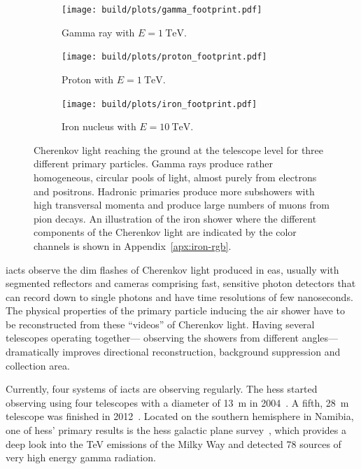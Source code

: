 \begin{figure}
  \centering
  \begin{subfigure}{0.3333\textwidth}%
    \texttt{[image: build/plots/gamma\_footprint.pdf]}%
    \caption{Gamma ray with $E = \SI{1}{\TeV}$.}%
  \end{subfigure}%
  \hfill%
  \begin{subfigure}{0.3333\textwidth}%
    \texttt{[image: build/plots/proton\_footprint.pdf]}%
    \caption{Proton with $E = \SI{1}{\TeV}$.}%
  \end{subfigure}%
  \hfill%
  \begin{subfigure}{0.3333\textwidth}%
    \texttt{[image: build/plots/iron\_footprint.pdf]}%
    \caption{Iron nucleus with $E = \SI{10}{\TeV}$.}%
  \end{subfigure}%
  \caption{%
    Cherenkov light reaching the ground at the telescope level for
    three different primary particles. 
    Gamma rays produce rather homogeneous, circular pools of light, almost
    purely from electrons and positrons. 
    Hadronic primaries produce more subshowers with high transversal momenta and
    produce large numbers of muons from pion decays.
    An illustration of the iron shower where the different components of the
    Cherenkov light are indicated by the color channels is shown in Appendix~\ref{apx:iron-rgb}.
  }
  \label{fig:footprints}
\end{figure}


\glspl{iact} observe the dim flashes of Cherenkov light produced in \gls{eas},
usually with segmented reflectors and cameras comprising fast, sensitive 
photon detectors that can record down to single photons and have time resolutions
of few nanoseconds.
The physical properties of the primary particle inducing the air shower have to
be reconstructed from these \enquote{videos} of Cherenkov light. 
Having several telescopes operating together—%
observing the showers from different angles—%
dramatically improves directional reconstruction, background suppression and collection area.

Currently, four systems of \glspl{iact} are observing regularly.
The \gls{hess} started observing using four telescopes with a diameter of \SI{13}{\meter}
in 2004~\cite{hess-p1}. 
A fifth, \SI{28}{\meter} telescope was finished in 2012~\cite{hess-p1}.
Located on the southern hemisphere in Namibia, one of \gls{hess}' primary 
results is the \gls{hess} galactic plane survey~\cite{hps}, which 
provides a deep look into the \si{\TeV} emissions of the Milky Way and
detected 78 sources of very high energy gamma radiation.

